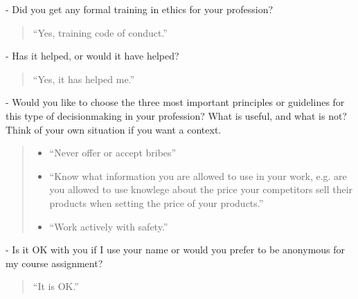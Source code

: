 \documentclass[12pt,a4paper]{article}
\begin{document}
\noindent- Did you get any formal training in ethics for your profession?
\begin{quote}
  ``Yes, training code of conduct.''
\end{quote}

\noindent- Has it helped, or would it have helped?
\begin{quote}
  ``Yes, it has helped me.''
\end{quote}

\noindent- Would you like to choose the three most important principles or guidelines for this type of decisionmaking in your profession? What is useful, and what is not? Think of your own situation if you want a context.
\begin{quote}
  \begin{itemize}
  \item ``Never offer or accept bribes''
  \item ``Know what information you are allowed to use in your work, e.g. are you allowed to use knowlege about the price your competitors sell their products when setting the price of your products.''
  \item ``Work actively with safety.''
  \end{itemize}
\end{quote}

\noindent- Is it OK with you if I use your name or would you prefer to be anonymous for my course assignment?
\begin{quote}
  ``It is OK.''
\end{quote}
\end{document}

